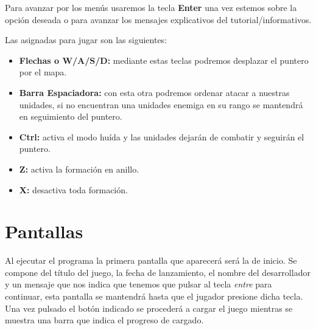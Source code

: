 Para avanzar por los menús usaremos la tecla \textbf{Enter} una vez estemos sobre la opción deseada o
para avanzar los mensajes explicativos del tutorial/informativos.

Las asignadas para jugar son las siguientes:
\begin{itemize}
	\item \textbf{Flechas o W/A/S/D:} mediante estas teclas podremos desplazar el puntero por el mapa.
	\item \textbf{Barra Espaciadora:} con esta otra podremos ordenar atacar a nuestras unidades,
									  si no encuentran una unidades enemiga en su rango se mantendrá
									  en seguimiento del puntero.
	\item \textbf{Ctrl:} activa el modo huída y las unidades dejarán de combatir y seguirán el
					  puntero.	
	\item \textbf{Z:} activa la formación en anillo.									  
	\item \textbf{X:} desactiva toda formación.									  
\end{itemize}

\section{Pantallas}
Al ejecutar el programa la primera pantalla que aparecerá será la de 
inicio. Se compone del título del juego, la fecha de lanzamiento,
el nombre del desarrollador y un mensaje que nos indica que tenemos que pulsar al tecla
\textit{entre} para continuar, esta pantalla se mantendrá hasta que el jugador presione
dicha tecla.\\
Una vez pulsado el botón indicado se procederá a cargar el juego mientras se muestra
una barra que indica el progreso de cargado.

